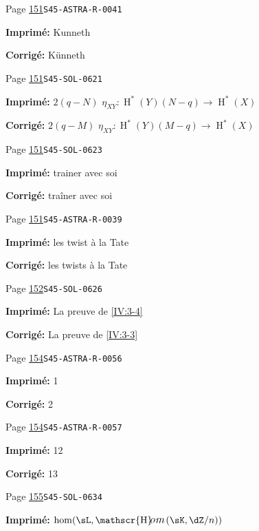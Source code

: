 \documentclass[oneside]{book}
\providecommand\calligra{\itshape}}
\DeclareMathOperator{\h}{H}
\DeclareMathOperator{\Hom}{\mathscr{H}\text{\kern -3pt {\calligra\large om}}\,} %
\theoremstyle{sga-source}
\theoremstyle{sga-source-dash}
\theoremstyle{sga-source-dotdash}
\theoremstyle{sga-source-number-note-dash}
\theoremstyle{sga-source-note-number-dotdash}
\theoremstyle{sga-source-example-dotdash}
\theoremstyle{sga-source-inline-number}
\theoremstyle{sga-source-bare-number}
\theoremstyle{sga-source}
\begin{document}
\begin{description}
\smallskip
\item[\hypertarget{apparatus:FR-0118}{118}] Page \hyperlink{printpage:fr:151}{151}\quad\texttt{S45-ASTRA-R-0041}
\par\noindent\textbf{Imprimé:} Kunneth
\par\noindent\textbf{Corrigé:} K\"unneth
\smallskip
\item[\hypertarget{apparatus:FR-0119}{119}] Page \hyperlink{printpage:fr:151}{151}\quad\texttt{S45-SOL-0621}
\par\noindent\textbf{Imprimé:} $2(q-N)$ $\eta_{XY}:\h^*(Y)(N-q)\to \h^*(X)$
\par\noindent\textbf{Corrigé:} $2(q-M)$ $\eta_{XY}:\h^*(Y)(M-q)\to \h^*(X)$
\smallskip
\item[\hypertarget{apparatus:FR-0120}{120}] Page \hyperlink{printpage:fr:151}{151}\quad\texttt{S45-SOL-0623}
\par\noindent\textbf{Imprimé:} trainer avec soi
\par\noindent\textbf{Corrigé:} traîner avec soi
\smallskip
\item[\hypertarget{apparatus:FR-0121}{121}] Page \hyperlink{printpage:fr:151}{151}\quad\texttt{S45-ASTRA-R-0039}
\par\noindent\textbf{Imprimé:} les twist à la Tate
\par\noindent\textbf{Corrigé:} les twists à la Tate
\smallskip
\item[\hypertarget{apparatus:FR-0122}{122}] Page \hyperlink{printpage:fr:152}{152}\quad\texttt{S45-SOL-0626}
\par\noindent\textbf{Imprimé:} La preuve de \ref{IV:3-4}
\par\noindent\textbf{Corrigé:} La preuve de \ref{IV:3-3}
\smallskip
\item[\hypertarget{apparatus:FR-0123}{123}] Page \hyperlink{printpage:fr:154}{154}\quad\texttt{S45-ASTRA-R-0056}
\par\noindent\textbf{Imprimé:} 1
\par\noindent\textbf{Corrigé:} 2
\smallskip
\item[\hypertarget{apparatus:FR-0124}{124}] Page \hyperlink{printpage:fr:154}{154}\quad\texttt{S45-ASTRA-R-0057}
\par\noindent\textbf{Imprimé:} 12
\par\noindent\textbf{Corrigé:} 13
\smallskip
\item[\hypertarget{apparatus:FR-0125}{125}] Page \hyperlink{printpage:fr:155}{155}\quad\texttt{S45-SOL-0634}
\par\noindent\textbf{Imprimé:} \(\hom(\sL,\Hom(\sK,\dZ/n))\)

\end{description}
\end{document}
